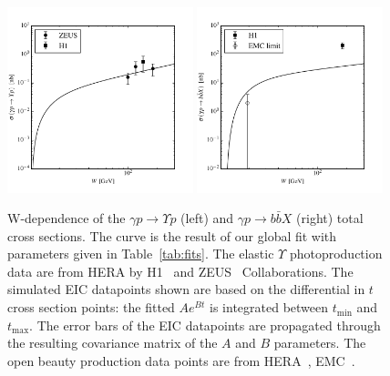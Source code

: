 \documentclass[10pt,prd,aps,nofootinbib,superscriptaddress]{revtex4}
\begin{document}
\begin{figure}
\includegraphics[width=0.48\textwidth]{si_y.pdf}
\includegraphics[width=0.48\textwidth]{si_bbX.pdf}
\caption{W-dependence of the $\gamma p \to \Upsilon p$ (left) and $\gamma p \to b \bar b X$ (right) total cross sections.
The curve is the result of our global fit with parameters given in Table~\ref{tab:fits}.
The elastic $\Upsilon$ photoproduction data are from HERA by H1~\cite{Adloff:2000vm}
and ZEUS~\cite{Breitweg:1998ki, Chekanov:2009zz} Collaborations.
The simulated EIC datapoints shown are based on the differential in $t$ cross section points:
the fitted $Ae^{Bt}$ is integrated between $t_\mathrm{min}$ and $t_\mathrm{max}$.
The error bars of the EIC datapoints are propagated through the resulting covariance matrix of the $A$ and $B$ parameters.
The open beauty production data points are from HERA~\cite{Adloff:1999nr}, EMC~\cite{Aubert:1981gx}.}
\label{fig:sigmatot}
\end{figure}
\end{document}
